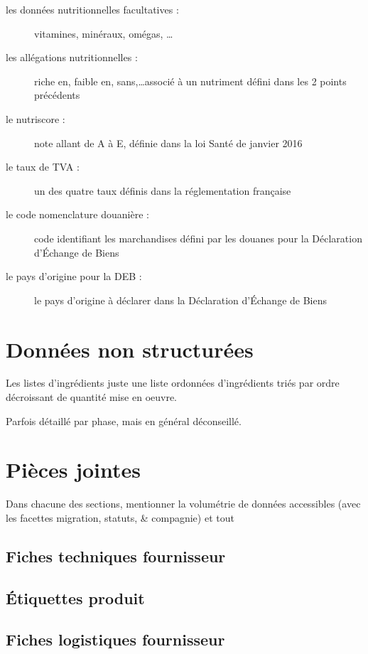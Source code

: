 \begin{description}
            \item[les données nutritionnelles facultatives :] vitamines, minéraux, omégas, \dots
            \item[les allégations nutritionnelles :] riche en, faible en, sans,\dots associé à un nutriment défini dans les 2 points précédents
            \item[le nutriscore :] note allant de A à E, définie dans la loi Santé de janvier 2016
            \item[le taux de TVA :] un des quatre taux définis dans la réglementation française
            \item[le code nomenclature douanière :] code identifiant les marchandises défini par les douanes pour la Déclaration d'\'{E}change de Biens~\cite{notions_DEB}
            \item[le pays d'origine pour la DEB :] le pays d'origine à déclarer dans la Déclaration d'\'{E}change de Biens~\cite{notions_DEB}
            \item[] 
        \end{description}
        
        
        \section{Données non structurées}
        
        Les listes d'ingrédients juste une liste ordonnées d'ingrédients triés par ordre décroissant de quantité mise en oeuvre.

        Parfois détaillé par phase, mais en général déconseillé.
        \section{Pièces jointes}
            \label{pieces_jointes}

            Dans chacune des sections, mentionner la volumétrie de données accessibles (avec les facettes migration, statuts, \& compagnie) et tout

            \subsection{Fiches techniques fournisseur}
            \subsection{\'{E}tiquettes produit}
            \subsection{Fiches logistiques fournisseur}
